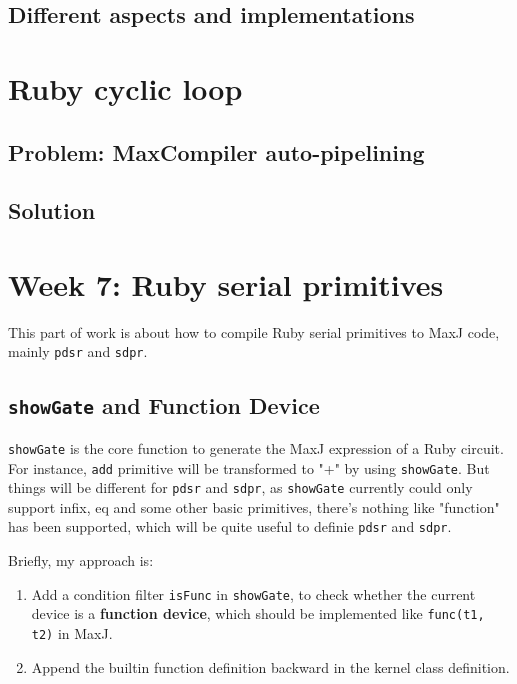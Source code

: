 \documentclass[a4paper, 10pt]{article}
\begin{document}
\subsection{Different aspects and implementations}

\section{Ruby cyclic loop}

\subsection{Problem: MaxCompiler auto-pipelining}

\subsection{Solution}

\section{Week 7: Ruby serial primitives}

This part of work is about how to compile Ruby serial primitives to MaxJ code, mainly \texttt{pdsr} and \texttt{sdpr}. 

\subsection{\texttt{showGate} and Function Device}
\texttt{showGate} is the core function to generate the MaxJ expression of a Ruby circuit. For instance, \texttt{add} primitive will be transformed to "+" by using \texttt{showGate}. But things will be different for \texttt{pdsr} and \texttt{sdpr}, as \texttt{showGate} currently could only support infix, eq and some other basic primitives, there's nothing like "function" has been supported, which will be quite useful to definie \texttt{pdsr} and \texttt{sdpr}.

Briefly, my approach is:
\begin{enumerate}
\item Add a condition filter \texttt{isFunc} in \texttt{showGate}, to check whether the current device is a \textbf{function device}, which should be implemented like \texttt{func(t1, t2)} in MaxJ. 
\item Append the builtin function definition backward in the kernel class definition. 
\end{enumerate}
\end{document}
